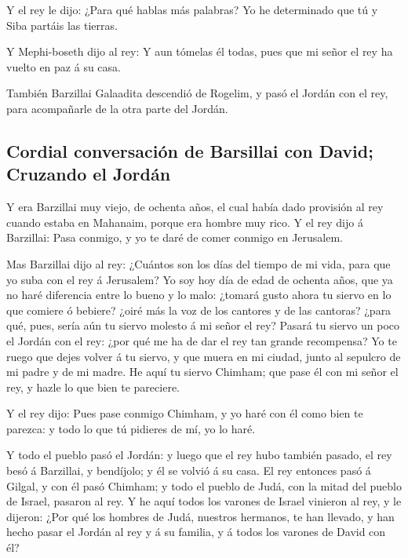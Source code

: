  Y el rey le dijo: ¿Para qué hablas más palabras? Yo he
determinado que tú y Siba partáis las tierras.

 Y Mephi-boseth dijo al rey: Y aun tómelas él todas, pues
que mi señor el rey ha vuelto en paz á su casa.

 También Barzillai Galaadita descendió de Rogelim, y pasó
el Jordán con el rey, para acompañarle de la otra parte del Jordán.

\hypertarget{cordial-conversaciuxf3n-de-barsillai-con-david-cruzando-el-jorduxe1n}{%
\subsection{Cordial conversación de Barsillai con David; Cruzando el
Jordán}\label{cordial-conversaciuxf3n-de-barsillai-con-david-cruzando-el-jorduxe1n}}

 Y era Barzillai muy viejo, de ochenta años, el cual había
dado provisión al rey cuando estaba en Mahanaim, porque era hombre muy
rico.  Y el rey dijo á Barzillai: Pasa conmigo, y yo te
daré de comer conmigo en Jerusalem.

 Mas Barzillai dijo al rey: ¿Cuántos son los días del
tiempo de mi vida, para que yo suba con el rey á Jerusalem?
 Yo soy hoy día de edad de ochenta años, que ya no haré
diferencia entre lo bueno y lo malo: ¿tomará gusto ahora tu siervo en lo
que comiere ó bebiere? ¿oiré más la voz de los cantores y de las
cantoras? ¿para qué, pues, sería aún tu siervo molesto á mi señor el
rey?  Pasará tu siervo un poco el Jordán con el rey: ¿por
qué me ha de dar el rey tan grande recompensa?  Yo te ruego
que dejes volver á tu siervo, y que muera en mi ciudad, junto al
sepulcro de mi padre y de mi madre. He aquí tu siervo Chimham; que pase
él con mi señor el rey, y hazle lo que bien te pareciere.

 Y el rey dijo: Pues pase conmigo Chimham, y yo haré con él
como bien te parezca: y todo lo que tú pidieres de mí, yo lo haré.

 Y todo el pueblo pasó el Jordán: y luego que el rey hubo
también pasado, el rey besó á Barzillai, y bendíjolo; y él se volvió á
su casa.  El rey entonces pasó á Gilgal, y con él pasó
Chimham; y todo el pueblo de Judá, con la mitad del pueblo de Israel,
pasaron al rey.  Y he aquí todos los varones de Israel
vinieron al rey, y le dijeron: ¿Por qué los hombres de Judá, nuestros
hermanos, te han llevado, y han hecho pasar el Jordán al rey y á su
familia, y á todos los varones de David con él?

